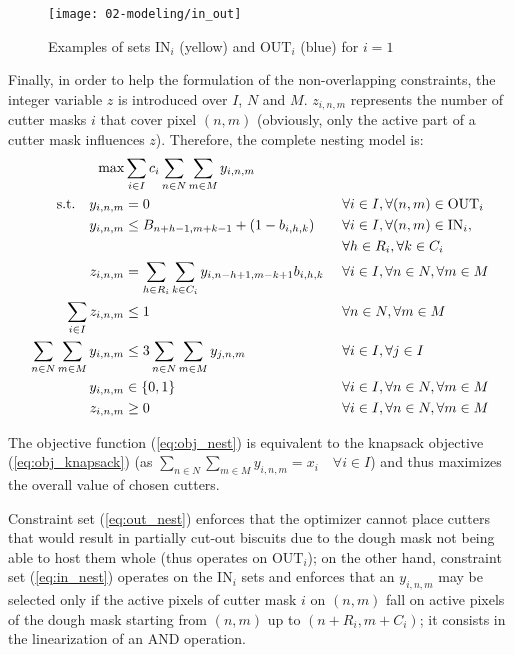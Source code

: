 \begin{figure}[H]
	\centering	
	\texttt{[image: 02-modeling/in\_out]}
	\caption{Examples of sets $\textrm{IN}_i$ (yellow) and $\textrm{OUT}_i$ (blue) for $i=1$}
	\label{fig:in_out}
\end{figure}

Finally, in order to help the formulation of the non-overlapping constraints, the integer variable $z$ is introduced over $I$, $N$ and $M$. $z_{i, n, m}$ represents the number of cutter masks $i$ that cover pixel $(n, m)$ (obviously, only the active part of a cutter mask influences $z$). Therefore, the complete nesting model is:
\begin{alignat}{3}
	\textrm{max}	& \sum_{i \in I}{c_i \sum_{n \in N}{\sum_{m \in M}{y_{i,n,m}}}} && \label{eq:obj_nest} \\
	\textrm{s.t.} \quad y_{i, n, m} & = 0 && \forall i \in I, \forall (n, m) \in \textrm{OUT}_i \label{eq:out_nest} \\
	y_{i, n, m} & \leq B_{n+h-1, m+k-1} + (1 - b_{i, h, k}) && \forall i \in I, \forall (n, m) \in \textrm{IN}_i, \notag \\
	& & & \forall h \in R_i, \forall k \in C_i \label{eq:in_nest} \\
	z_{i, n, m} & = \sum_{h \in R_i}{\sum_{k \in C_i}{y_{i,n-h+1, m-k+1}  b_{i, h, k}}} &\ & \forall i \in I, \forall n \in N, \forall m \in M \label{eq:link_nest} \\
	\sum_{i \in I}{z_{i, n, m}} & \leq 1 && \forall n \in N, \forall m \in M \label{eq:overlap_nest} \\
	\sum_{n \in N}{\sum_{m \in M}{y_{i,n,m}}} & \leq 3 \sum_{n \in N}{\sum_{m \in M}{y_{j,n,m}}} && \forall i \in I, \forall j \in I \label{eq:freq_nest} \\					
y_{i, n, m} & \in \{0, 1\} && \forall i \in I, \forall n \in N, \forall m \in M \label{eq:def_y} \\
z_{i, n, m} & \geq 0 && \forall i \in I, \forall n \in N, \forall m \in M \label{eq:def_z}
\end{alignat}

The objective function (\ref{eq:obj_nest}) is equivalent to the knapsack objective (\ref{eq:obj_knapsack}) (as $\sum_{n \in N}{\sum_{m \in M}{y_{i,n,m}}} = x_i \quad \forall i \in I$) and thus maximizes the overall value of chosen cutters. 

Constraint set (\ref{eq:out_nest}) enforces that the optimizer cannot place cutters that would result in partially cut-out biscuits due to the dough mask not being able to host them whole (thus operates on $\textrm{OUT}_i$); on the other hand, constraint set (\ref{eq:in_nest}) operates on the $\textrm{IN}_i$ sets and enforces that an $y_{i, n, m}$ may be selected only if the active pixels of cutter mask $i$ on $(n, m)$ fall on active pixels of the dough mask starting from $(n, m)$ up to $(n+R_i, m+C_i)$; it consists in the linearization of an AND operation. 

